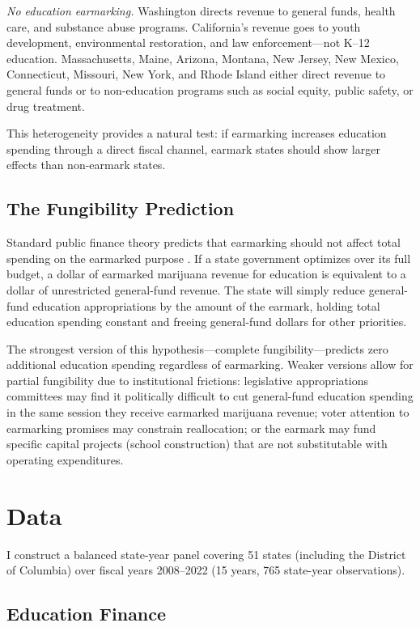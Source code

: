 \documentclass[12pt]{article}
\begin{document}
\textit{No education earmarking.} Washington directs revenue to general funds, health care, and substance abuse programs. California's revenue goes to youth development, environmental restoration, and law enforcement---not K--12 education. Massachusetts, Maine, Arizona, Montana, New Jersey, New Mexico, Connecticut, Missouri, New York, and Rhode Island either direct revenue to general funds or to non-education programs such as social equity, public safety, or drug treatment.

This heterogeneity provides a natural test: if earmarking increases education spending through a direct fiscal channel, earmark states should show larger effects than non-earmark states.

\subsection{The Fungibility Prediction}

Standard public finance theory predicts that earmarking should not affect total spending on the earmarked purpose \citep{hines1995anomalies}. If a state government optimizes over its full budget, a dollar of earmarked marijuana revenue for education is equivalent to a dollar of unrestricted general-fund revenue. The state will simply reduce general-fund education appropriations by the amount of the earmark, holding total education spending constant and freeing general-fund dollars for other priorities.

The strongest version of this hypothesis---complete fungibility---predicts zero additional education spending regardless of earmarking. Weaker versions allow for partial fungibility due to institutional frictions: legislative appropriations committees may find it politically difficult to cut general-fund education spending in the same session they receive earmarked marijuana revenue; voter attention to earmarking promises may constrain reallocation; or the earmark may fund specific capital projects (school construction) that are not substitutable with operating expenditures.


\section{Data}

I construct a balanced state-year panel covering 51 states (including the District of Columbia) over fiscal years 2008--2022 (15 years, 765 state-year observations).

\subsection{Education Finance}
\end{document}
